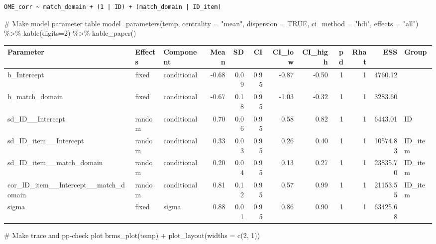 \documentclass[
  letterpaper,
  DIV=11,
  numbers=noendperiod]{scrartcl}
\newenvironment{Shaded}{\begin{snugshade}}{\end{snugshade}}
\newcommand{\AttributeTok}[1]{\textcolor[rgb]{0.40,0.45,0.13}{#1}}
\newcommand{\CommentTok}[1]{\textcolor[rgb]{0.37,0.37,0.37}{#1}}
\newcommand{\ConstantTok}[1]{\textcolor[rgb]{0.56,0.35,0.01}{#1}}
\newcommand{\DecValTok}[1]{\textcolor[rgb]{0.68,0.00,0.00}{#1}}
\newcommand{\FunctionTok}[1]{\textcolor[rgb]{0.28,0.35,0.67}{#1}}
\newcommand{\NormalTok}[1]{\textcolor[rgb]{0.00,0.23,0.31}{#1}}
\newcommand{\SpecialCharTok}[1]{\textcolor[rgb]{0.37,0.37,0.37}{#1}}
\newcommand{\StringTok}[1]{\textcolor[rgb]{0.13,0.47,0.30}{#1}}
\begin{document}
\begin{verbatim}
OME_corr ~ match_domain + (1 | ID) + (match_domain | ID_item) 
\end{verbatim}

\begin{Shaded}
\begin{Highlighting}[]
\CommentTok{\# Make model parameter table}
\FunctionTok{model\_parameters}\NormalTok{(temp, }\AttributeTok{centrality =} \StringTok{"mean"}\NormalTok{, }\AttributeTok{dispersion =} \ConstantTok{TRUE}\NormalTok{, }
                 \AttributeTok{ci\_method =} \StringTok{"hdi"}\NormalTok{, }\AttributeTok{effects =} \StringTok{"all"}\NormalTok{) }\SpecialCharTok{\%\textgreater{}\%} 
  \FunctionTok{kable}\NormalTok{(}\AttributeTok{digits=}\DecValTok{2}\NormalTok{) }\SpecialCharTok{\%\textgreater{}\%} \FunctionTok{kable\_paper}\NormalTok{()}
\end{Highlighting}
\end{Shaded}

\begin{longtable*}[t]{lllrrrrrrrrl}
\toprule
Parameter & Effects & Component & Mean & SD & CI & CI\_low & CI\_high & pd & Rhat & ESS & Group\\
\midrule
b\_Intercept & fixed & conditional & -0.68 & 0.09 & 0.95 & -0.87 & -0.50 & 1 & 1 & 4760.12 & \\
b\_match\_domain & fixed & conditional & -0.67 & 0.18 & 0.95 & -1.03 & -0.32 & 1 & 1 & 3283.60 & \\
sd\_ID\_\_Intercept & random & conditional & 0.70 & 0.06 & 0.95 & 0.58 & 0.82 & 1 & 1 & 6443.01 & ID\\
sd\_ID\_item\_\_Intercept & random & conditional & 0.33 & 0.03 & 0.95 & 0.26 & 0.40 & 1 & 1 & 10574.83 & ID\_item\\
sd\_ID\_item\_\_match\_domain & random & conditional & 0.20 & 0.04 & 0.95 & 0.13 & 0.27 & 1 & 1 & 23835.70 & ID\_item\\
\addlinespace
cor\_ID\_item\_\_Intercept\_\_match\_domain & random & conditional & 0.81 & 0.12 & 0.95 & 0.57 & 0.99 & 1 & 1 & 21153.55 & ID\_item\\
sigma & fixed & sigma & 0.88 & 0.01 & 0.95 & 0.86 & 0.90 & 1 & 1 & 63425.68 & \\
\bottomrule
\end{longtable*}

\begin{Shaded}
\begin{Highlighting}[]
\CommentTok{\# Make trace and pp{-}check plot}
\FunctionTok{brms\_plot}\NormalTok{(temp)  }\SpecialCharTok{+} \FunctionTok{plot\_layout}\NormalTok{(}\AttributeTok{widths =} \FunctionTok{c}\NormalTok{(}\DecValTok{2}\NormalTok{, }\DecValTok{1}\NormalTok{))}
\end{Highlighting}
\end{Shaded}
\end{document}
